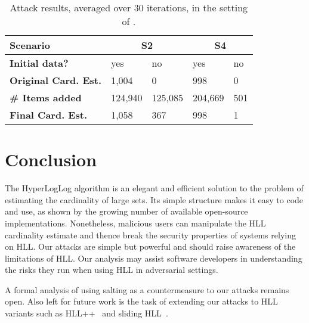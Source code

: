 \documentclass{IEEEtran}
\begin{document}
\begin{table}[h]
\caption{Attack results, averaged over 30 iterations, in the setting of \cite{hllvuln}.}
\begin{tabular}{| m{8.5em} | m{4em} | m{4em} | m{4em} | m{4em} |}
    \hline
    \textbf{Scenario} & \multicolumn{2}{c|}{S2} & \multicolumn{2}{c|}{S4} \\ \hline
    \textbf{Initial data?} & yes & no & yes & no \\ \hline
    \textbf{Original Card. Est.} & 1,004 & 0 & 998 & 0 \\ \hline
    \textbf{\# Items added} & 124,940 & 125,085 & 204,669 & 501 \\ \hline
    \textbf{Final Card. Est.} & 1,058 & 367 & 998 & 1 \\ \hline
\end{tabular}
\label{table:tab2}
\end{table}

\section{Conclusion}\label{sec:conclusions}
The HyperLogLog algorithm is an elegant and efficient solution to the problem of estimating the cardinality of large sets. Its simple structure makes it easy to code and use, as shown by the growing number of available open-source implementations. Nonetheless, malicious users can manipulate the HLL cardinality estimate and thence break the security properties of systems relying on HLL. Our attacks are simple but powerful and should raise awareness of the limitations of HLL. Our analysis may assist software developers in understanding the risks they run when using HLL in adversarial settings.

A formal analysis of using salting as a countermeasure to our attacks remains open.
Also left for future work is the task of extending our attacks to HLL variants such as HLL++~\cite{hllpratice} and sliding HLL~\cite{slidinghll}.



\end{document}
